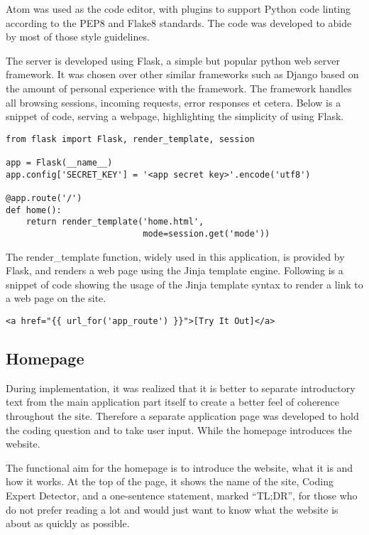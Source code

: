 \documentclass{report}
\begin{document}
Atom was used as the code editor, with plugins to support Python code linting according to the PEP8 and Flake8 standards. The code was developed to abide by most of those style guidelines.

The server is developed using Flask, a simple but popular python web server framework. It was chosen over other similar frameworks such as Django based on the amount of personal experience with the framework. The framework handles all browsing sessions, incoming requests, error responses et cetera. Below is a snippet of code, serving a webpage, highlighting the simplicity of using Flask.

\begin{lstlisting}
from flask import Flask, render_template, session

app = Flask(__name__)
app.config['SECRET_KEY'] = '<app secret key>'.encode('utf8')

@app.route('/')
def home():
    return render_template('home.html',
                           mode=session.get('mode'))

\end{lstlisting}

The render\_template function, widely used in this application, is provided by Flask, and renders a web page using the Jinja template engine. Following is a snippet of code showing the usage of the Jinja template syntax to render a link to a web page on the site.

\begin{lstlisting}
<a href="{{ url_for('app_route') }}">[Try It Out]</a>
\end{lstlisting}

\subsection{Homepage}

During implementation, it was realized that it is better to separate introductory text from the main application part itself to create a better feel of coherence throughout the site. Therefore a separate application page was developed to hold the coding question and to take user input. While the homepage introduces the website.

The functional aim for the homepage is to introduce the website, what it is and how it works. At the top of the page, it shows the name of the site, Coding Expert Detector, and a one-sentence statement, marked “TL;DR”, for those who do not prefer reading a lot and would just want to know what the website is about as quickly as possible.
\end{document}
